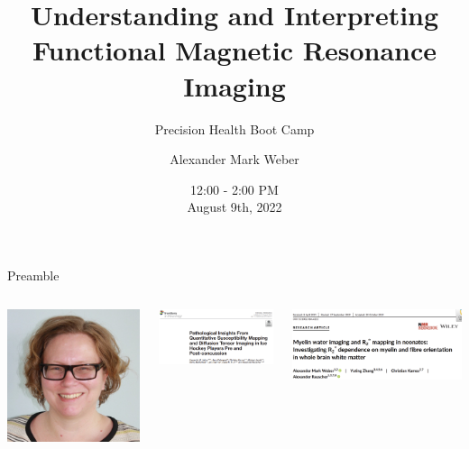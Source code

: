 \documentclass[aspectratio=169,xcolor=dvipsnames]{beamer}
\title[Functional MRI: Part 1 of 2]{Understanding and Interpreting \\Functional Magnetic Resonance Imaging}
\subtitle{Precision Health Boot Camp}
\author[Dr. Alexander Mark Weber] {Alexander Mark Weber}
\institute[UBC] %
{
    Department of Pediatrics, Division of Neurology \\
    University of British Columbia 
    \vskip 3pt
}
\date{12:00 - 2:00 PM \\August 9th, 2022} %
\begin{document}
\begin{frame}
    \titlepage
\end{frame}

\begin{frame}{Preamble}

\begin{columns}[c]
\begin{center}
\includegraphics[width=.7\textwidth]{imgs/Lynne}
\end{center}


\includegraphics[width=.9\textwidth]{imgs/lit6}

\vspace{.2cm}

\includegraphics[width=.9\textwidth]{imgs/lit7}


\end{columns}
\end{frame}
\end{document}
